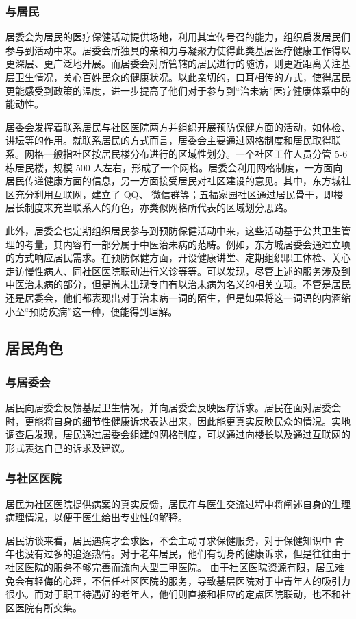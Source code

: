 \subsubsection{与居民}
居委会为居民的医疗保健活动提供场地，利用其宣传号召的能力，组织启发居民们参与到活动中来。居委会所独具的亲和力与凝聚力使得此类基层医疗健康工作得以更深层、更广泛地开展。而居委会对所管辖的居民进行的随访，则更近距离关注基层卫生情况，关心百姓民众的健康状况。以此亲切的，口耳相传的方式，使得居民更能感受到政策的温度，进一步提高了他们对于参与到“治未病”医疗健康体系中的能动性。

居委会发挥着联系居民与社区医院两方并组织开展预防保健方面的活动，如体检、讲坛等的作用。就联系居民的方式而言，居委会主要通过网格制度和居民取得联系。网格一般指社区按居民楼分布进行的区域性划分。一个社区工作人员分管 5-6 栋居民楼，规模 500 人左右，形成了一个网格。居委会利用网格制度，一方面向居民传递健康方面的信息，另一方面接受居民对社区建设的意见。其中，东方城社区充分利用互联网，建立了 QQ、 微信群等；五福家园社区通过居民骨干，即楼层长制度来充当联系人的角色，亦类似网格所代表的区域划分思路。

此外，居委会也定期组织居民参与到预防保健活动中来，这些活动基于公共卫生管理的考量，其内容有一部分属于中医治未病的范畴。例如，东方城居委会通过立项的方式响应居民需求。在预防保健方面，开设健康讲堂、定期组织职工体检、关心走访慢性病人、同社区医院联动进行义诊等等。可以发现，尽管上述的服务涉及到中医治未病的部分，但是尚未出现专门有以治未病为名义的相关立项。不管是居民还是居委会，他们都表现出对于治未病一词的陌生，但是如果将这一词语的内涵缩小至“预防疾病”这一种，便能得到理解。

\subsection{居民角色}
\subsubsection{与居委会}
居民向居委会反馈基层卫生情况，并向居委会反映医疗诉求。居民在面对居委会时，更能将自身的细节性健康诉求表达出来，因此能更真实反映民众的情况。实地调查后发现，居民通过居委会组建的网格制度，可以通过向楼长以及通过互联网的形式表达自己的诉求及建议。
\subsubsection{与社区医院}
居民为社区医院提供病案的真实反馈，居民在与医生交流过程中将阐述自身的生理病理情况，以便于医生给出专业性的解释。

居民访谈来看，居民遇病才会求医，不会主动寻求保健服务，对于保健知识中 青年也没有过多的追逐热情。对于老年居民，他们有切身的健康诉求，但是往往由于社区医院的服务不够完善而流向大型三甲医院。
由于社区医院资源有限，居民难免会有轻侮的心理，不信任社区医院的服务，导致基层医院对于中青年人的吸引力很小。而对于职工待遇好的老年人，他们则直接和相应的定点医院联动，也不和社区医院有所交集。
